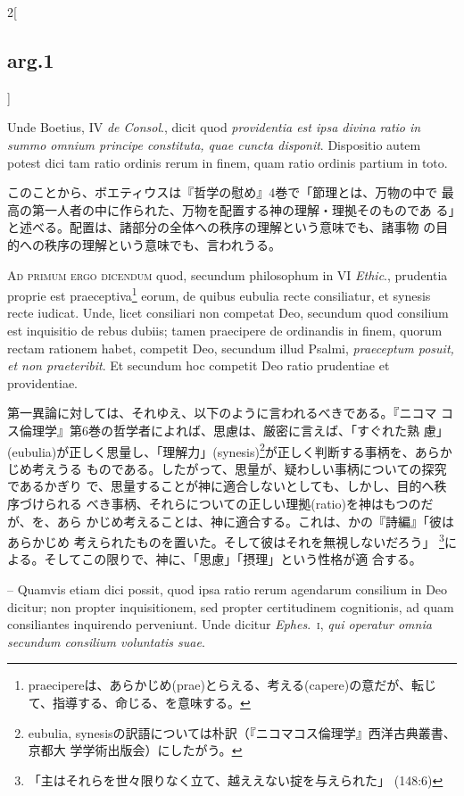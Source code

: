 \documentclass[paper=a4paper,fontsize=10pt,jafontsize=9pt,titlepage]{jlreq}
\begin{document}
\begin{paracol}{2}[\subsection{arg.1}]
\switchcolumn*

Unde Boetius, IV {\itshape de Consol}., dicit quod
{\itshape providentia est ipsa divina ratio in summo omnium principe constituta,
quae cuncta disponit}. Dispositio autem potest dici tam ratio ordinis
rerum in finem, quam ratio ordinis partium in toto.

\switchcolumn

このことから、ボエティウスは『哲学の慰め』4巻で「節理とは、万物の中で
最高の第一人者の中に作られた、万物を配置する神の理解・理拠そのものであ
る」と述べる。配置は、諸部分の全体への秩序の理解という意味でも、諸事物
の目的への秩序の理解という意味でも、言われうる。

\switchcolumn*[\subsection{ad.1}]

{\scshape Ad primum ergo dicendum} quod, secundum
philosophum in VI {\itshape Ethic}., prudentia proprie est praeceptiva\footnote{praecipereは、あらかじめ(prae)とらえる、考える(capere)の意だが、転じて、指導する、命じる、を意味する。} eorum, de
quibus eubulia recte consiliatur, et synesis recte iudicat. Unde, licet
consiliari non competat Deo, secundum quod consilium est inquisitio de
rebus dubiis; tamen praecipere de ordinandis in finem, quorum rectam
rationem habet, competit Deo, secundum illud Psalmi, {\itshape praeceptum posuit,
et non praeteribit}. Et secundum hoc competit Deo ratio prudentiae et
providentiae.

\switchcolumn

第一異論に対しては、それゆえ、以下のように言われるべきである。『ニコマ
コス倫理学』第6巻の哲学者によれば、思慮は、厳密に言えば、「すぐれた熟
慮」(eubulia)が正しく思量し、「理解力」(synesis)\footnote{eubulia,
synesisの訳語については朴訳（『ニコマコス倫理学』西洋古典叢書、京都大
学学術出版会）にしたがう。}が正しく判断する事柄を、あらかじめ考えうる
ものである。したがって、思量が、疑わしい事柄についての探究であるかぎり
で、思量することが神に適合しないとしても、しかし、目的へ秩序づけられる
べき事柄、それらについての正しい理拠(ratio)を神はもつのだが、を、あら
かじめ考えることは、神に適合する。これは、かの『詩編』「彼はあらかじめ
考えられたものを置いた。そして彼はそれを無視しないだろう」
\footnote{「主はそれらを世々限りなく立て、越ええない掟を与えられた」
(148:6)}による。そしてこの限りで、神に、「思慮」「摂理」という性格が適
合する。

\switchcolumn*

-- Quamvis etiam dici possit, quod ipsa ratio rerum agendarum
consilium in Deo dicitur; non propter inquisitionem, sed propter
certitudinem cognitionis, ad quam consiliantes inquirendo
perveniunt. Unde dicitur {\itshape Ephes}.~{\scshape i}, {\itshape qui operatur omnia secundum consilium
voluntatis suae}.


\end{paracol}
\end{document}

